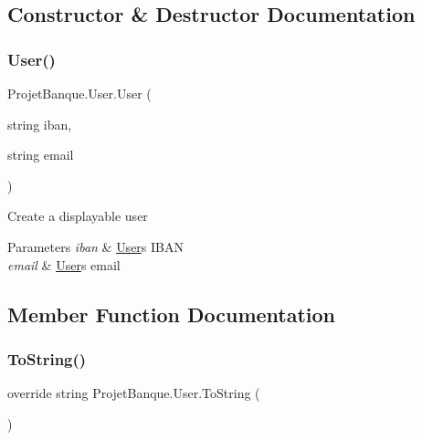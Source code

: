\subsection{Constructor \& Destructor Documentation}
\mbox{\label{class_projet_banque_1_1_user_a3d3b0681eb830335e5311bb4d4caf067}} 
\subsubsection{\texorpdfstring{User()}{User()}}
{\footnotesize\ttfamily Projet\+Banque.\+User.\+User (\begin{DoxyParamCaption}\item[{string}]{iban,  }\item[{string}]{email }\end{DoxyParamCaption})}



Create a displayable user 


\begin{DoxyParams}{Parameters}
{\em iban} & \mbox{\hyperlink{class_projet_banque_1_1_user}{User}}\textquotesingle{}s I\+B\+AN\\
\hline
{\em email} & \mbox{\hyperlink{class_projet_banque_1_1_user}{User}}\textquotesingle{}s email\\
\hline
\end{DoxyParams}


\subsection{Member Function Documentation}
\mbox{\label{class_projet_banque_1_1_user_ae29c534876d9b815be00cb2f2059e1a6}} 
\subsubsection{\texorpdfstring{ToString()}{ToString()}}
{\footnotesize\ttfamily override string Projet\+Banque.\+User.\+To\+String (\begin{DoxyParamCaption}{ }\end{DoxyParamCaption})}



